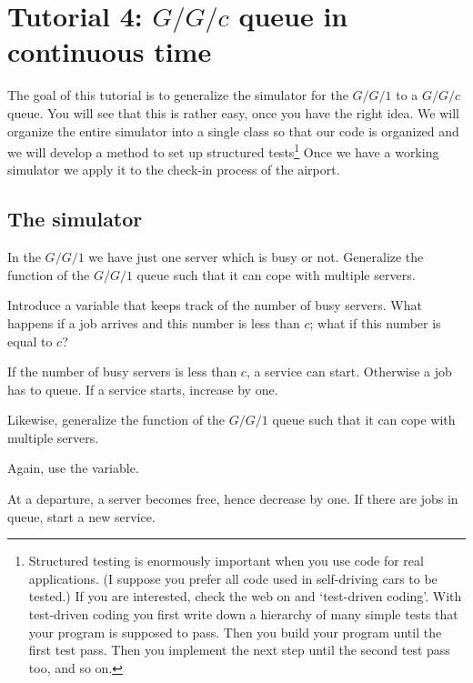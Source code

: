 \section{Tutorial 4: $G/G/c$ queue in continuous time}
\label{sec:ggc-continuous-time}

The goal of this tutorial is to  generalize the simulator for the $G/G/1$ to a $G/G/c$ queue. You will see that this is rather easy, once you have the right idea. We will organize the entire simulator into a single class so that our code is organized and we will develop a method to set up structured  tests\footnote{Structured testing is enormously important when you use code for real applications. (I suppose you prefer all code used in self-driving cars to be tested.)  If you are interested, check the web on   and `test-driven coding'. With test-driven coding you first write down a hierarchy of  many simple tests that your program is supposed to pass.  Then you build your program until the first test pass. Then you implement the next step until the second test pass too, and so on.} Once we have a working simulator we apply it to the check-in process of the airport.



\subsection{The simulator}
\label{sec:simulator}

\begin{exercise}
In the $G/G/1$ we have just one server which is busy or not.
  Generalize  the  function of the $G/G/1$ queue such that it can cope with multiple servers.

\begin{hint}
  Introduce a  variable that keeps track of the number of busy servers. What happens if a job arrives and this number is less than $c$; what if this number is equal to $c$?
\end{hint}
\begin{solution}
    If the number of busy servers is less than $c$, a service can start. Otherwise a job has to queue. If a service starts, increase  by one.
  \end{solution}
\end{exercise}


\begin{exercise}
Likewise,   generalize  the  function of the $G/G/1$ queue such that it can cope with multiple servers.
\begin{hint}
  Again, use the  variable.
\end{hint}

\begin{solution}
  At a departure, a server becomes free, hence decrease  by one. If there are jobs in queue, start a new service.
\end{solution}
\end{exercise}

